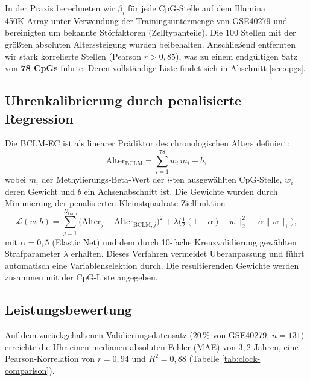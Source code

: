 \documentclass[12pt,a4paper]{article}
\begin{document}
	In der Praxis berechneten wir \(\beta_i\) für jede CpG‑Stelle auf dem Illumina 450K‑Array unter Verwendung der Trainingsuntermenge von GSE40279 und bereinigten um bekannte Störfaktoren (Zelltypanteile). Die 100 Stellen mit der größten absoluten Alterssteigung wurden beibehalten. Anschließend entfernten wir stark korrelierte Stellen (Pearson \(r > 0,85\)), was zu einem endgültigen Satz von \textbf{78 CpGs} führte. Deren vollständige Liste findet sich in Abschnitt \ref{sec:cpgs}.
	
	\subsection{Uhrenkalibrierung durch penalisierte Regression}
	Die BCLM‑EC ist als linearer Prädiktor des chronologischen Alters definiert:
	\begin{equation}
		\mathrm{Alter}_{\mathrm{BCLM}} = \sum_{i=1}^{78} w_i \, m_i + b,
		\label{eq:clock}
	\end{equation}
	wobei \(m_i\) der Methylierungs‑Beta‑Wert der \(i\)-ten ausgewählten CpG‑Stelle, \(w_i\) deren Gewicht und \(b\) ein Achsenabschnitt ist. Die Gewichte wurden durch Minimierung der penalisierten Kleinstquadrate‑Zielfunktion
	\[
	\mathcal{L}(w,b) = \sum_{j=1}^{N_{\mathrm{train}}} \bigl( \mathrm{Alter}_j - \mathrm{Alter}_{\mathrm{BCLM},j} \bigr)^2 + \lambda \bigl( \tfrac{1}{2}(1-\alpha)\|w\|_2^2 + \alpha\|w\|_1 \bigr),
	\]
	mit \(\alpha=0,5\) (Elastic Net) und dem durch 10‑fache Kreuzvalidierung gewählten Strafparameter \(\lambda\) erhalten. Dieses Verfahren vermeidet Überanpassung und führt automatisch eine Variablenselektion durch. Die resultierenden Gewichte werden zusammen mit der CpG‑Liste angegeben.
	
	\subsection{Leistungsbewertung}
	Auf dem zurückgehaltenen Validierungsdatensatz (20\,\% von GSE40279, \(n=131\)) erreichte die Uhr einen medianen absoluten Fehler (MAE) von \(3,2\) Jahren, eine Pearson‑Korrelation von \(r=0,94\) und \(R^2=0,88\) (Tabelle \ref{tab:clock-comparison}).
	
\end{document}

